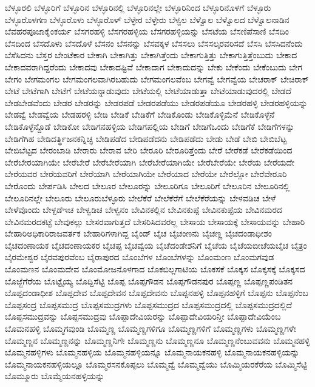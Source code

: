 {ಬೆಳ್ಳೂರಲಿ
ಬೆಳ್ಳೂರಿಗೆ
ಬೆಳ್ಳೂರಿನ
ಬೆಳ್ಳೂರಿನಲ್ಲಿ
ಬೆಳ್ಳೂರಿನಲ್ಲೇ
ಬೆಳ್ಳೂರಿನಿಂದ
ಬೆಳ್ಳೂರಿನೊಳಗೆ
ಬೆಳ್ಳೂರು
ಬೆಳ್ಳೂರೊಳಗಣ
ಬೆಳ್ಳೂರೊಳು
ಬೆಳ್ಳೂರೊಳ್
ಬೆಳ್ಳೇರ
ಬೆಳ್ಳೇರು
ಬೆಳ್ವಲ
ಬೆಳ್ವೊಲ
ಬೆಳ್ವೊಲದ
ಬೆಳ್ವೊಲನಾಡಿನ
ಬೆವಹರಪೂಜಾಕೈಂಕರ್ಯ
ಬೆಸಗರಹಳ್ಳಿ
ಬೆಸಗರಹಳ್ಳಿಯ
ಬೆಸಗರಹಳ್ಳಿಯನ್ನು
ಬೆಸಟೆಯ
ಬೆಸಣಿಪೆಸಾಣಿ
ಬೆಸದಿಂ
ಬೆಸದಿಂದ
ಬೆಸದೊಳು
ಬೆಸದೊಳೆ
ಬೆಸನಂ
ಬೆಸನನ್ನು
ಬೆಸವಕ್ಕಳ
ಬೆಸಸಲು
ಬೆಸಸಲ್ಕರವರಿಸದೆ
ಬೆಸಸಿ
ಬೆಸಸಿದನೆಂದು
ಬೆಸೆಸಿದನು
ಬೆಸ್ತರ
ಬೇಂಟೆಕಾರ
ಬೇಕಾಗಿ
ಬೇಕಾಗಿತ್ತು
ಬೇಕಾಗಿತ್ತೆಂದು
ಬೇಕಾಗುತ್ತಿತ್ತು
ಬೇಕಾಗುತ್ತಿತ್ತೆಂಬುದು
ಬೇಕಾದ
ಬೇಕಾದವರಾಗಿದ್ದರೆಂದು
ಬೇಕಾದವು
ಬೇಕಾದಷ್ಟಿವೆ
ಬೇಕಾದಾಗ
ಬೇಕಾದುದನ್ನು
ಬೇಕು
ಬೇಕೆಂದು
ಬೇಕೆಂಬುದು
ಬೇಗ
ಬೇಗಂ
ಬೇಗಮಂಗಲ
ಬೇಗಮಂಗಲವಾಗಿರಬಹುದು
ಬೇಗಮಂಗಲವೆಂಬ
ಬೇಗವ್ವೆ
ಬೇಗವ್ವೆಯ
ಬೇಚರಾಕ್
ಬೇಚಿರಾಕ್
ಬೇಟೆ
ಬೇಟೆಗಾಗಿ
ಬೇಟೆಗೆ
ಬೇಟೆಯನ್ನಾಡುವುದು
ಬೇಟೆಯಲ್ಲಿ
ಬೇಟೆಯಾಡುತ್ತಾ
ಬೇಟೆಯಾಡುವುದರಲ್ಲಿ
ಬೇಡದೆ
ಬೇಡಬೇಡವೆಂದು
ಬೇಡರ
ಬೇಡರನ್ನು
ಬೇಡರಪಡೆ
ಬೇಡರಪಡೆಯು
ಬೇಡರಪಡೆಯೂ
ಬೇಡರಹಳ್ಳಿ
ಬೇಡರಹಳ್ಳಿಯನ್ನು
ಬೇಡವ್ವೆ
ಬೇಡವ್ವೆಯ
ಬೇಡಹರಳ್ಳಿ
ಬೇಡಿ
ಬೇಡಿಕೆ
ಬೇಡಿಕೆಗೆ
ಬೇಡಿಕೊಂಡು
ಬೇಡಿಕೊಳ್ಳಿಮೆನೆ
ಬೇಡಿಕೊಳ್ಳೆನೆ
ಬೇಡಿಕೊಳ್ಳೆನ್ದೊಡೆ
ಬೇಡಿಕೋ
ಬೇಡಿಗನಹಳ್ಳಿಯ
ಬೇಡಿಗಪಲ್ಲಿಯ
ಬೇಡಿಗೆ
ಬೇಡಿಗೆಒಂದು
ಬೇಡಿಗೆಕೆ
ಬೇಡಿಗೆಗಳನ್ನು
ಬೇಡಿಗೆಗಿಹ
ಬೇಡಿದರ್ತ್ಥಿಜನಕನ್ನಿಚ್ಛ
ಬೇಡಿಪಡೆದ
ಬೇಡಿಪಡೆದನು
ಬೇಡಿಪಡೆದು
ಬೇಡು
ಬೇಡೆ
ಬೇಬಿ
ಬೇಬಿಬೆಟ್ಟ
ಬೇಬಿಬೆಟ್ಟದ
ಬೇರಂಬಾಡಿ
ಬೇರಾರು
ಬೇರಾವ
ಬೇರಿ
ಬೇರೂರಿ
ಬೇರೂರಿತ್ತೆಂದು
ಬೇರೆ
ಬೇರೆಕಡೆ
ಬೇರೆಕಡೆಯಿಂದ
ಬೇರೆಬೇರಯಾಗಿಯೇ
ಬೇರೆಬೇರೆ
ಬೇರೆಬೇರೆಯಾಗಿ
ಬೇರೆಬೇರೆಯಾಗಿಯೇ
ಬೇರೆಬೇರೆಯೇ
ಬೇರೆಯ
ಬೇರೆಯದೇ
ಬೇರೆಯವರ
ಬೇರೆಯವರಿಗೆ
ಬೇರೆಯಾಗಿ
ಬೇರೆಯಾಗಿಯೇ
ಬೇರೆಯಾದ
ಬೇರೆಯೇ
ಬೇರೆಲ್ಲೋ
ಬೇರೆವೇರೂರಿ
ಬೇರೊಂದು
ಬೇರ್ಪಡಿಸಿ
ಬೇಲದ
ಬೇಲೂರ
ಬೇಲೂರನ್ನು
ಬೇಲೂರಿಗೂ
ಬೇಲೂರಿಗೆ
ಬೇಲೂರಿನ
ಬೇಲೂರಿನಲ್ಲಿ
ಬೇಲೂರಿನಲ್ಲೇ
ಬೇಲೂರು
ಬೇಲೂರುಬೆಳ್ಳೂರು
ಬೇಲೆಕೆರೆ
ಬೇಲೆಕೆರೆಗೆ
ಬೇಲೆಕೆರೆಯನ್ನು
ಬೇಳವಡಿಚ
ಬೇಳೆ
ಬೇಳೆವೊಂದು
ಬೇಳ್ಪಡೆಇಚ
ಬೇಳ್ವಡಿಚ
ಬೇಳ್ವನಂ
ಬೇವಿನಕಲ್ಲಿನ
ಬೇವಿನಕುಪ್ಪೆ
ಬೇವಿನಕುಪ್ಪೆಯ
ಬೇವಿನಮರದ
ಬೇವಿನಮರದಕಟ್ಟೆ
ಬೇವುಕಲ್ಲು
ಬೇಸರವಾಗುತ್ತದೆ
ಬೇಸರಿಸಿದವರಲ್ಲ
ಬೇಸಾಯ
ಬೇಸಾಯಕ್ಕೆ
ಬೇಸಾಯವನ್ನು
ಬೇಹಾರಿ
ಬೇಹಾರಿಅಧಿಕಾರಿರಾಜವರ್ತಕ
ಬೇಹಾರಿಗಳಾಗಿದ್ದ
ಬೈಂಡ್
ಬೈಚ
ಬೈಚಂಣನು
ಬೈಚಣ್ಣ
ಬೈಚದಂಡಾಧೀಶಂ
ಬೈಚದಂಣಾಯಕ
ಬೈಚದಂಣಾಯಕರ
ಬೈಚಪ್ಪ
ಬೈಚವ್ವೆಯ
ಬೈಚೆದಂಡೇಶನಿಗೆ
ಬೈಚೆಯ
ಬೈಚೆಯಬೀಚೆಯಬೈಚ
ಬೈತ್ರಂ
ಬೈರಮೇಶ್ವರ
ಬೈರವಪುರವೆಂಬ
ಬೈರಾಪುರದ
ಬೊಂಬೆಗಳ
ಬೊಂಬೆಗಳನ್ನು
ಬೊಂಮಂಣ
ಬೊಂಮಗವುಡ
ಬೊಂಮಣನ
ಬೊಂಮದೇವ
ಬೊಂಮೋಜನೊಳಗಾದ
ಬೊಕಬಿಲ್ಲಗಾಟಿಯ
ಬೊಕಸಕೆ
ಬೊಕ್ಕಸ
ಬೊಕ್ಕಸಕ್ಕೆ
ಬೊಕ್ಕಸದ
ಬೊಜ್ಜೆಗೆರೆಯ
ಬೊಟ್ಟೈಯ್ಯ
ಬೊದ್ದಿಸೆಟ್ಟಿ
ಬೊಪ್ಪ
ಬೊಪ್ಪಗೌಡನ
ಬೊಪ್ಪಗೌಡನಪುರ
ಬೊಪ್ಪಣ್ಣ
ಬೊಪ್ಪಣ್ಣಪಂಡಿತನ
ಬೊಪ್ಪದಂಡಾಧೀಶ
ಬೊಪ್ಪದೇವ
ಬೊಪ್ಪದೇವನ
ಬೊಪ್ಪದೇವನು
ಬೊಪ್ಪನಹಳ್ಳಿ
ಬೊಪ್ಪನಹಳ್ಳಿಗೆ
ಬೊಪ್ಪನು
ಬೊಪ್ಪನೆಂಬ
ಬೊಪ್ಪಸಂದ್ರ
ಬೊಪ್ಪಸಮುದ್ರ
ಬೊಪ್ಪಸಮುದ್ರಗಳು
ಬೊಪ್ಪಸಮುದ್ರದ
ಬೊಪ್ಪಸಮುದ್ರದಲ್ಲಿ
ಬೊಪ್ಪಸಮುದ್ರದಲ್ಲಿದೆ
ಬೊಪ್ಪಸಮುದ್ರವನ್ನು
ಬೊಪ್ಪಸಮುದ್ರವು
ಬೊಪ್ಪಾದೇವಿಯರನ್ನು
ಬೊಪ್ಪಾದೇವಿಯರಿನ್ತೀ
ಬೊಪ್ಪಾದೇವಿಯೆಂಬ
ಬೊಮನಹಳ್ಳಿ
ಬೊಮ್ಮಗವುಂಡಿ
ಬೊಮ್ಮಣ್ಣ
ಬೊಮ್ಮಣ್ಣಗಳಿಗೂ
ಬೊಮ್ಮಣ್ಣಗಳಿಗೆ
ಬೊಮ್ಮಣ್ಣಗಳು
ಬೊಮ್ಮಣ್ಣಗಳೇ
ಬೊಮ್ಮಣ್ಣನ
ಬೊಮ್ಮಣ್ಣನನ್ನು
ಬೊಮ್ಮಣ್ಣನಿಗೇ
ಬೊಮ್ಮಣ್ಣನು
ಬೊಮ್ಮಣ್ಣನೂ
ಬೊಮ್ಮಣ್ಣನೆಂಬುವವನು
ಬೊಮ್ಮನಹಳ್ಳಿ
ಬೊಮ್ಮನಹಳ್ಳಿಗಳು
ಬೊಮ್ಮನಹಳ್ಳಿಯ
ಬೊಮ್ಮನಹಳ್ಳಿಯನ್ನೂ
ಬೊಮ್ಮನಾಯಕನಹಳ್ಳಿ
ಬೊಮ್ಮನಾಯಕನಹಳ್ಳಿಯನ್ನು
ಬೊಮ್ಮನಾಯಕನಹಳ್ಳಿಯಲ್ಲೂ
ಬೊಮ್ಮರಸನಕೊಪ್ಪಲು
ಬೊಮ್ಮವ್ವೆ
ಬೊಮ್ಮವ್ವೆಯು
ಬೊಮ್ಮಿಯರಕೆರೆಯ
ಬೊಮ್ಮಿಸೆಟ್ಟಿ
ಬೊಮ್ಮೂರು
ಬೊಮ್ಮೆಯನಹಳ್ಳಿಯನ್ನು
}
